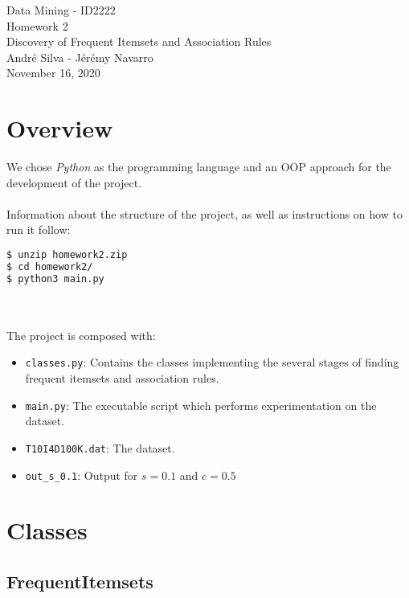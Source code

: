 \documentclass[]{article}
\begin{document}
\begin{center}
  {\large Data Mining - ID2222}\\
  \vspace{7mm}
  {\huge Homework 2\\[1ex]}
  {\Large Discovery of Frequent Itemsets and Association Rules }\\
  \vspace{7mm}  
  {André Silva - Jérémy Navarro\\}
  \vspace{4mm}
  {\large November 16, 2020\\}
\end{center}

\section{Overview}

We chose \textit{Python} as the programming language and an \textsc{OOP} approach for the development of the project.\\
\\
Information about the structure of the project, as well as instructions on how to run it follow:

\begin{lstlisting}[language=bash]
$ unzip homework2.zip
$ cd homework2/
$ python3 main.py
\end{lstlisting}\\
\\
The project is composed with:

\begin{itemize}
    \item \texttt{classes.py}: Contains the classes implementing the several stages of finding frequent itemsets and association rules.
    \item \texttt{main.py}: The executable script which performs experimentation on the dataset.
    \item \texttt{T10I4D100K.dat}: The dataset.
    \item \texttt{out\_s\_0.1}: Output for $s=0.1$ and $c=0.5$
\end{itemize}

\section{Classes}

\subsection{FrequentItemsets}
\end{document}
